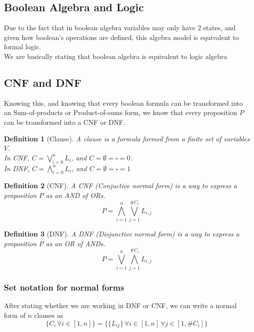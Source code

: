 \documentclass{report}
\newtheorem{definition}{Definition}[section]
\begin{document}
        \subsection{Boolean Algebra and Logic}
            Due to the fact that in boolean algebra variables may only have 2 states, 
            and given how boolean's operations are defined, this algebra model is equivalent
            to formal logic. \\
            We are basically stating that boolean algebra is equivalent to logic algebra 
        \subsection{CNF and DNF}
            Knowing this, and knowing that every boolean formula can be transformed 
            into an Sum-of-products or Product-of-sums form, we know that every 
            proposition $P$ can be transformed into a CNF or DNF. \\
            \begin{definition}[Clause]
                A clause is a formula formed from a finite set of variables $V$. \\
                In CNF, $C = \bigvee_{i=0}^n L_i$, and $C = \emptyset = \square = 0$. \\
                In DNF, $C = \bigwedge_{i=0}^n L_i$, and $C = \emptyset = \square = 1$
            \end{definition}
            \begin{definition}[CNF]
                A CNF (Conjuctive normal form) is a way to express a proposition
                $P$ as an AND of ORs. 
                $$P = \bigwedge_{i=1}^n\bigvee_{j=1}^{\#C_i}L_{i,j}$$
            \end{definition}
            \begin{definition}[DNF]
                A DNF (Disjunctive normal form) is a way to express a proposition $P$ 
                as an OR of ANDs.
                $$P =  \bigvee_{i=1}^n\bigwedge_{j=1}^{\#C_i}L_{i,j}$$
            \end{definition}
            \subsubsection{Set notation for normal forms}
                After stating whether we are working in DNF or CNF, we can write a normal form 
                of $n$ clauses as
                $$\{C_i \, \forall i \in \left[1, n\right]\} = 
                    \{\{L_{ij}\} \, \forall i \in \left[1, n\right] \, \forall j \in \left[1, \#C_i\right]\}$$
\end{document}
